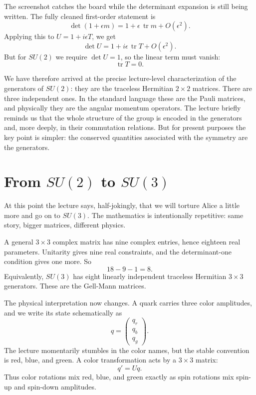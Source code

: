 The screenshot catches the board while the determinant expansion is still being written. The fully cleaned first-order statement is
\begin{equation}
\det(1+\epsilon m)=1+\epsilon\,\operatorname{tr}m+O(\epsilon^2).
\end{equation}
Applying this to \(U=1+i\epsilon T\), we get
\begin{equation}
\det U = 1 + i\epsilon\,\operatorname{tr}T + O(\epsilon^2).
\end{equation}
But for \(SU(2)\) we require \(\det U=1\), so the linear term must vanish:
\begin{equation}
\operatorname{tr}T=0.
\end{equation}

We have therefore arrived at the precise lecture-level characterization of the generators of \(SU(2)\): they are the traceless Hermitian \(2\times2\) matrices. There are three independent ones. In the standard language these are the Pauli matrices, and physically they are the angular momentum operators. The lecture briefly reminds us that the whole structure of the group is encoded in the generators and, more deeply, in their commutation relations. But for present purposes the key point is simpler: the conserved quantities associated with the symmetry are the generators.

\section{From \(SU(2)\) to \(SU(3)\)}

At this point the lecture says, half-jokingly, that we will torture Alice a little more and go on to \(SU(3)\). The mathematics is intentionally repetitive: same story, bigger matrices, different physics.

A general \(3\times3\) complex matrix has nine complex entries, hence eighteen real parameters. Unitarity gives nine real constraints, and the determinant-one condition gives one more. So
\begin{equation}
18-9-1=8.
\end{equation}
Equivalently, \(SU(3)\) has eight linearly independent traceless Hermitian \(3\times3\) generators. These are the Gell-Mann matrices.

The physical interpretation now changes. A quark carries three color amplitudes, and we write its state schematically as
\begin{equation}
q=
\begin{pmatrix}
q_r\\
q_b\\
q_g
\end{pmatrix}.
\end{equation}
The lecture momentarily stumbles in the color names, but the stable convention is red, blue, and green. A color transformation acts by a \(3\times3\) matrix:
\begin{equation}
q' = Uq.
\end{equation}
Thus color rotations mix red, blue, and green exactly as spin rotations mix spin-up and spin-down amplitudes.

